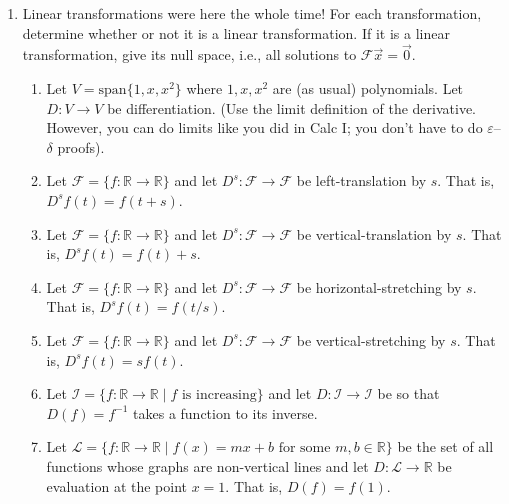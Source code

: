 \documentclass[letter]{article}
\newcommand{\R}{\mathbb{R}}
\newcommand{\Span}{\mathrm{span}}
\begin{document}
\begin{enumerate}
		\item {\sc Linear transformations were here the whole time!} For each transformation, determine
			whether or not it is a linear transformation.  If it is a linear transformation, give
			its null space, i.e., all solutions to $\mathcal F\vec x=\vec 0$.
			\begin{enumerate}
				\item Let $V=\Span\{1,x,x^2\}$ where $1,x,x^2$ are (as usual) polynomials.
					Let $D:V\to V$ be differentiation.  (Use the limit definition of 
					the derivative. However, you can
					do limits like you did in Calc I; you don't have to do $\varepsilon$--$\delta$
					proofs).
				\item Let $\mathcal F=\{f:\R\to \R\}$ and let $D^s:\mathcal F\to \mathcal F$
					be left-translation by $s$.  That is, $D^sf(t)=f(t+s)$.
				\item Let $\mathcal F=\{f:\R\to \R\}$ and let $D^s:\mathcal F\to \mathcal F$
					be vertical-translation by $s$.  That is, $D^sf(t)=f(t)+s$.
				\item Let $\mathcal F=\{f:\R\to \R\}$ and let $D^s:\mathcal F\to \mathcal F$
					be horizontal-stretching by $s$.  That is, $D^sf(t)=f(t/s)$.
				\item Let $\mathcal F=\{f:\R\to \R\}$ and let $D^s:\mathcal F\to \mathcal F$
					be vertical-stretching by $s$.  That is, $D^sf(t)=sf(t)$.
				\item Let $\mathcal I=\{f:\R\to \R\mid f\text{ is increasing}\}$ and let $D:\mathcal I\to \mathcal I$
					be so that $D(f)=f^{-1}$ takes a function to its inverse.
				\item Let $\mathcal L=\{f:\R\to \R\mid f(x)=mx+b\text{ for some }m,b\in\R\}$
					be the set of all functions whose graphs are non-vertical lines and let $D:\mathcal L\to \R$
					be evaluation at the point $x=1$.  That is, $D(f) = f(1)$.
			\end{enumerate}
	\end{enumerate}
\end{document}
